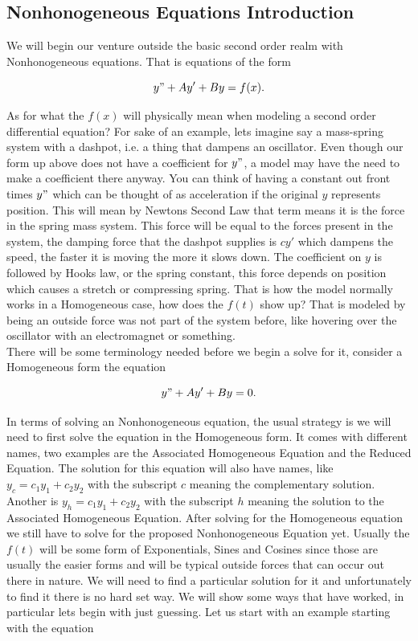 \documentclass[12pt]{article}
\begin{document}
\subsection{Nonhonogeneous Equations Introduction}

We will begin our venture outside the basic second order realm with Nonhonogeneous equations. That is equations of the form

\begin{equation*}
    y"+Ay'+By=f(x).
\end{equation*}

As for what the $f(x)$ will physically mean when modeling a second order differential equation? For sake of an example, lets imagine say a mass-spring system with a dashpot, i.e. a thing that dampens an oscillator. Even though our form up above does not have a coefficient for $y"$, a model may have the need to make a coefficient there anyway. You can think of having a constant out front times $y"$ which can be thought of as acceleration if the original $y$ represents position. This will mean by Newtons Second Law that term means it is the force in the spring mass system. This force will be equal to the forces present in the system, the damping force that the dashpot supplies is $cy'$ which dampens the speed, the faster it is moving the more it slows down. The coefficient on $y$ is followed by Hooks law, or the spring constant, this force depends on position which causes a stretch or compressing spring. That is how the model normally works in a Homogeneous case, how does the $f(t)$ show up? That is modeled by being an outside force was not part of the system before, like hovering over the oscillator with an electromagnet or something. \\

There will be some terminology needed before we begin a solve for it, consider a Homogeneous form the equation 

\begin{equation*}
    y"+Ay'+By=0.
\end{equation*}

In terms of solving an Nonhonogeneous equation, the usual strategy is we will need to first solve the equation in the Homogeneous form. It comes with different names, two examples are the Associated Homogeneous Equation and the Reduced Equation. The solution for this equation will also have names, like $y_c=c_1y_1+c_2y_2$ with the subscript $c$ meaning the complementary solution. Another is $y_h=c_1y_1+c_2y_2$ with the subscript $h$ meaning the solution to the Associated Homogeneous Equation. After solving for the Homogeneous equation we still have to solve for the proposed Nonhonogeneous Equation yet. Usually the $f(t)$ will be some form of Exponentials, Sines and Cosines since those are usually the easier forms and will be typical outside forces that can occur out there in nature. We will need to find a particular solution for it and unfortunately to find it there is no hard set way. We will show some ways that have worked, in particular lets begin with just guessing. Let us start with an example starting with the equation
\end{document}
